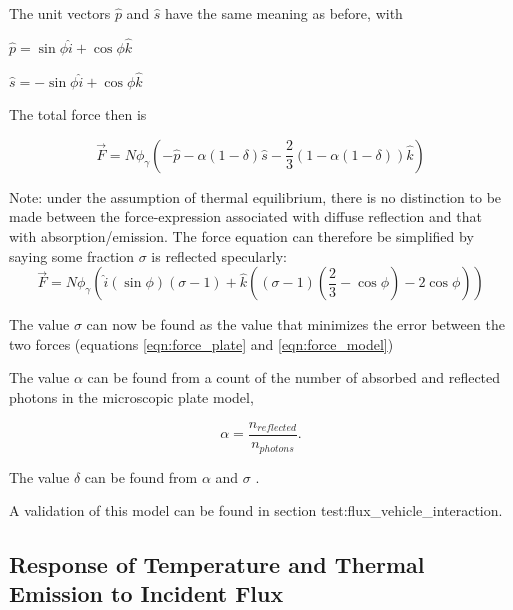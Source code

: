          The unit vectors  $\hat{p}$ and
         $\hat{s}$ have the same meaning as before, with

         $\hat{p}=\sin \phi \hat{i}+\cos \phi \hat{k}$

         $\hat{s}=-\sin \phi \hat{i}+\cos \phi \hat{k}$

         The total force then is

\begin{equation*}
         \vec{F}=N\phi _{\gamma }\left(-\hat{p}-\alpha (1-\delta
         )\hat{s}-\frac{2}{3}(1-\alpha (1-\delta ))\hat{k}\right)
\end{equation*}

          Note: under the assumption of thermal equilibrium, there is no
          distinction to be made between the force{}-expression associated with
          diffuse reflection and that with absorption/emission.  The force
          equation can therefore be simplified by saying some fraction
          $\sigma $ is reflected specularly:
          \begin{equation}
            \vec{F}=N\phi
            _{\gamma }\left(\hat{i}(\sin \phi )(\sigma -1)+\hat{k}\left((\sigma
            -1)\left(\frac{2}{3}-\cos \phi \right)-2\cos \phi \right)\right)
            \label{eqn:force_model}
          \end{equation}

          The value $\sigma $ can now be found as the
          value that minimizes the error between the two forces (equations
          \ref{eqn:force_plate} and \ref{eqn:force_model})

          The value $\alpha $ can be found from a count
          of the number of absorbed and reflected photons in the microscopic
          plate model,

          \begin{equation*}
          \alpha =\frac{n_{\mathit{reflected}}}{n_{\mathit{photons}}}.
          \end{equation*}

          The value $\delta $ can be found from $\alpha $ and $\sigma $ .

          A validation of this model can be found in section
          {test:flux_vehicle_interaction}.

  \subsection{Response of Temperature and Thermal Emission to Incident Flux}
  \label{sec:mathform_temp_resp}


